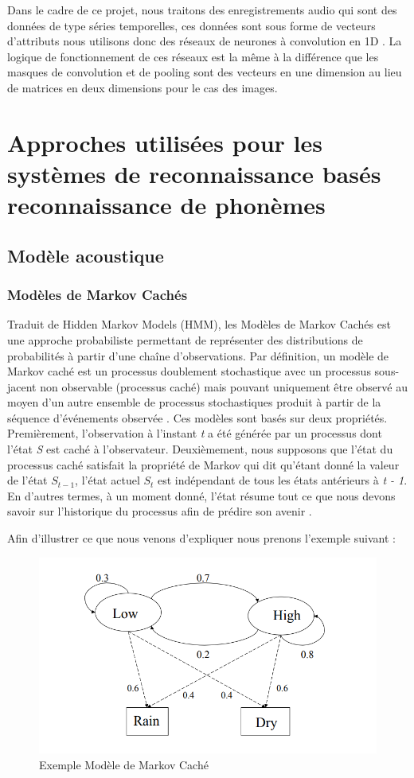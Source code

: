 Dans le cadre de ce projet, nous traitons des enregistrements audio qui sont des données de type séries temporelles, ces données sont sous forme de vecteurs d'attributs nous utilisons donc des réseaux de neurones à convolution en 1D \cite{cnn1d}. La logique de fonctionnement de ces réseaux est la même à la différence que les masques de convolution et de pooling sont des vecteurs en une dimension au lieu de matrices en deux dimensions pour le cas des images.

\section{Approches utilisées pour les systèmes de reconnaissance basés reconnaissance de phonèmes}
\subsection{Modèle acoustique}  
\subsubsection{Modèles de Markov Cachés}
Traduit de Hidden Markov Models (HMM), les Modèles de Markov Cachés est une approche probabiliste permettant de représenter des distributions de probabilités à partir d'une chaîne d'observations. Par définition, un modèle de Markov caché est un processus doublement stochastique avec un processus sous-jacent non observable (processus caché) mais pouvant uniquement être observé au moyen d'un autre ensemble de processus stochastiques produit à partir de la séquence d'événements observée \cite{hmmdef}. Ces modèles sont basés sur deux propriétés. Premièrement, l'observation à l'instant \textit{t} a été générée par un processus dont l'état \textit{S} est caché à l'observateur. Deuxièmement, nous supposons que l'état du processus caché satisfait la propriété de Markov qui dit qu'étant donné la valeur de l'état \textit{$S_{t-1}$}, l'état actuel \textit{$S_{t}$} est indépendant de tous les états antérieurs à \textit{t - 1}. En d'autres termes, à un moment donné, l'état résume tout ce que nous devons savoir sur l'historique du processus afin de prédire son avenir \cite{hmmdef2}.

Afin d'illustrer ce que nous venons d'expliquer nous prenons l'exemple suivant \cite{hmmexample} : 
\begin{figure}[H]
    \centering
    \includegraphics[width=350pt]{images/chap2/hmm_example.png}
    \caption{Exemple Modèle de Markov Caché}
\end{figure}

